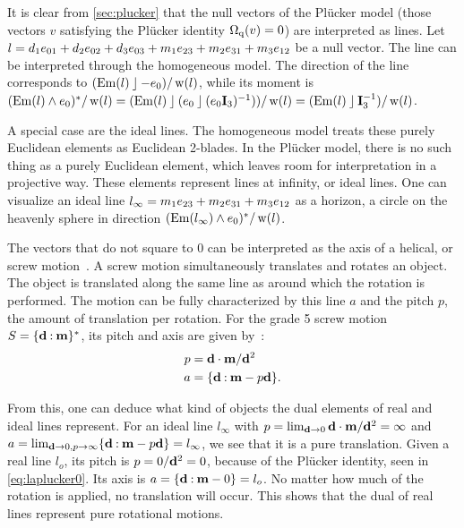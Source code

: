 It is clear from \autoref{sec:plucker} that the null vectors of the Pl\"ucker model (those vectors $v$ satisfying the Pl\"ucker identity $\operatorname{\Omega_q}(v) = 0$) are interpreted as lines.  Let $l = d_1 e_{01} + d_2 e_{02} + d_3 e_{03} + m_1 e_{23} + m_2 e_{31} + m_3 e_{12}$ be a null vector.  The line can be interpreted through the homogeneous model.  The direction of the line corresponds to $(\operatorname{Em}(l) \mathbin{\rfloor} -e_0) / \operatorname{w}(l)$, while its moment is $(\operatorname{Em}(l) \wedge e_0)^\ast / \operatorname{w}(l) = (\operatorname{Em}(l) \mathbin{\rfloor} (e_0 \mathbin{\rfloor} (e_0\mathbf{I}_3)^{-1})) / \operatorname{w}(l) = (\operatorname{Em}(l) \mathbin{\rfloor} \mathbf{I}_3^{-1}) / \operatorname{w}(l)$.  

A special case are the ideal lines.  The homogeneous model treats these purely Euclidean elements as Euclidean 2-blades.
In the Pl\"ucker model, there is no such thing as a purely Euclidean element, which leaves room for interpretation in a projective way.  These elements represent lines at infinity, or ideal lines.  One can visualize an ideal line $l_\infty = m_1 e_{23} + m_2 e_{31} + m_3 e_{12}$ as a horizon, a circle on the heavenly sphere in direction $(\operatorname{Em}(l_\infty) \wedge e_0)^\ast / \operatorname{w}(l)$.  

The vectors that do not square to $0$ can be interpreted as the axis of a helical, or screw motion~\cite[Section 3.1.2]{Pottmann}.  A screw motion simultaneously translates and rotates an object.  The object is translated along the same line as around which the rotation is performed.  The motion can be fully characterized by this line $a$ and the pitch $p$, the amount of translation per rotation.  For the grade 5 screw motion $S = \{\mathbf{d} \mathbin{:} \mathbf{m}\}^\ast$, its pitch and axis are given by~\cite[Theorem 3.1.9]{Pottmann}:
\begin{align}
  \label{eq:screwparams}
  p &= \mathbf{d} \mathbin{\cdot} \mathbf{m} / \mathbf{d}^2 \nonumber \\
  a &= \{\mathbf{d} \mathbin{:} \mathbf{m} - p \mathbf{d}\} .
\end{align}

From this, one can deduce what kind of objects the dual elements of real and ideal lines represent.  For an ideal line $l_\infty$ with $p = \lim_{\mathbf{d} \to 0} \mathbf{d} \mathbin{\cdot} \mathbf{m} / \mathbf{d}^2 = \infty$ and $a = \lim_{\mathbf{d} \to 0, p \to \infty} \{\mathbf{d} \mathbin{:} \mathbf{m} - p \mathbf{d}\} = l_\infty$, we see that it is a pure translation.  Given a real line $l_o$, its pitch is $p = 0 / \mathbf{d}^2 = 0$, because of the Pl\"ucker identity, seen in \autoref{eq:laplucker0}.  Its axis is $a = \{\mathbf{d} \mathbin{:} \mathbf{m} - 0\} = l_o$.  No matter how much of the rotation is applied, no translation will occur.  This shows that the dual of real lines represent pure rotational motions.
%


